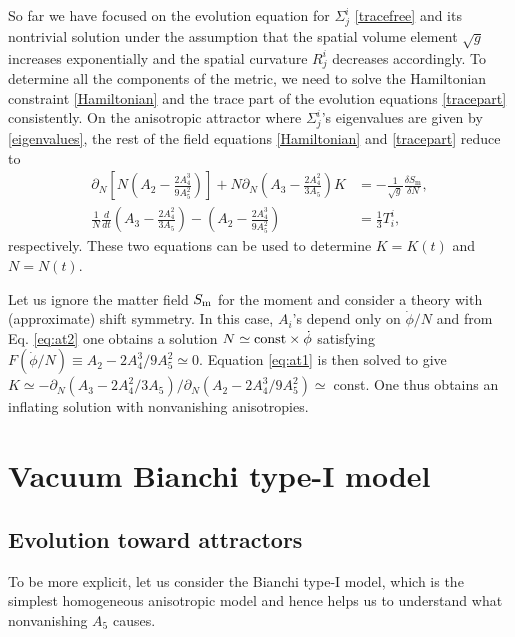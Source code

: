\documentclass[aps,prd,preprint,superscriptaddress,nofootinbib,tightenlines]{revtex4-1}
\begin{document}
So far we have focused on the evolution equation for $\Sigma^i_j$ \eqref{tracefree}
and its nontrivial solution under the assumption that
the spatial volume element $\sqrt{g}$ increases exponentially
and the spatial curvature $R^i_j$ decreases accordingly.
To determine all the components of the metric, we need to
solve the Hamiltonian constraint \eqref{Hamiltonian} and
the trace part of the evolution equations \eqref{tracepart} consistently.
On the anisotropic attractor where
$\Sigma^i_j$'s eigenvalues are given by \eqref{eigenvalues},
the rest of the field equations
\eqref{Hamiltonian} and \eqref{tracepart} reduce to
\begin{align}
\partial_N \left[ N \left( A_2 - \frac{2 A_4^3}{9 A_5^2} \right) \right]
+ N \partial_N \left( A_3 -\frac{2 A_4^2}{3 A_5} \right) K
&=
- \frac{1}{\sqrt{g}}\frac{\delta S_\mathrm{m} }{\delta N}
\label{eq:at1}
,
\\
\frac{1}{ N } \frac{d}{dt}
\left( A_3 -\frac{2 A_4^2}{3 A_5} \right)
- \left( A_2 - \frac{2 A_4^3}{9 A_5^2} \right)
&=\frac{1}{3} T^i_i,\label{eq:at2}
\end{align}
respectively.
These two equations can be used to determine $K=K(t)$ and $N=N(t)$.


Let us ignore the matter field $S_{\rm m}$ for the moment
and consider a theory with (approximate) shift symmetry.
In this case, $A_i$'s depend only on $\dot\phi/N$
and from Eq. \eqref{eq:at2}
one obtains a solution $N\simeq {\rm const}\times \dot\phi$
satisfying $F(\dot\phi/N)\equiv A_2- 2A_4^3/9A_5^2\simeq 0$. Equation \eqref{eq:at1} is then
solved to give $K\simeq -\partial_N(A_3-2A_4^2/3A_5)/\partial_N(A_2-2A_4^3/9A_5^2)%
\simeq\;$const. One thus obtains an inflating solution with nonvanishing anisotropies.



\section{Vacuum Bianchi type-I model}\label{Bianchimodel}
\subsection{Evolution toward attractors}
To be more explicit, let us consider
the Bianchi type-I model, which is the simplest homogeneous anisotropic model
and hence helps us to understand what nonvanishing $A_5$ causes.
\end{document}
